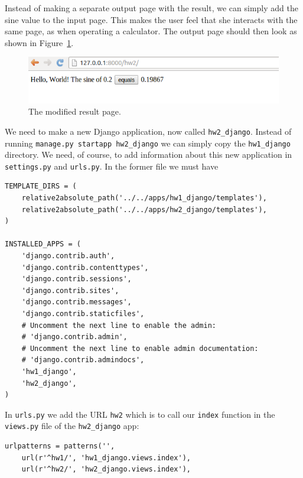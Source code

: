 \documentclass[%
oneside,                 %
final,                   %
10pt]{article}
\begin{document}
{Instead of making a separate output page with the result, we can
simply add the sine value to the input page. This makes the user
feel that she interacts with the same page, as when operating a calculator.
The output page should then look as shown in Figure~\ref{wf:hw2:django:fig:result}.


\begin{figure}[ht]
  \centerline{\includegraphics[width=0.9\linewidth]{fig-web4sa/hw2_django_output.png}}
  \caption{
  The modified result page. \label{wf:hw2:django:fig:result}
  }
\end{figure}


We need to make a new Django application, now called \Verb!hw2_django!.
Instead of running
\Verb!manage.py startapp hw2_django! we can simply copy the \Verb!hw1_django!
directory. We need, of course, to add information about this
new application in \Verb!settings.py! and \Verb!urls.py!.
In the former file we must have

\begin{Verbatim}[numbers=none,fontsize=\fontsize{9pt}{9pt},baselinestretch=0.85]
TEMPLATE_DIRS = (
    relative2absolute_path('../../apps/hw1_django/templates'),
    relative2absolute_path('../../apps/hw2_django/templates'),
)

INSTALLED_APPS = (
    'django.contrib.auth',
    'django.contrib.contenttypes',
    'django.contrib.sessions',
    'django.contrib.sites',
    'django.contrib.messages',
    'django.contrib.staticfiles',
    # Uncomment the next line to enable the admin:
    # 'django.contrib.admin',
    # Uncomment the next line to enable admin documentation:
    # 'django.contrib.admindocs',
    'hw1_django',
    'hw2_django',
)
\end{Verbatim}
In \Verb!urls.py! we add the URL \Verb!hw2! which is to call our \Verb!index! function
in the \Verb!views.py! file of the \Verb!hw2_django! app:

\begin{Verbatim}[numbers=none,fontsize=\fontsize{9pt}{9pt},baselinestretch=0.85]
urlpatterns = patterns('',
    url(r'^hw1/', 'hw1_django.views.index'),
    url(r'^hw2/', 'hw2_django.views.index'),
\end{Verbatim}

}
\end{document}
